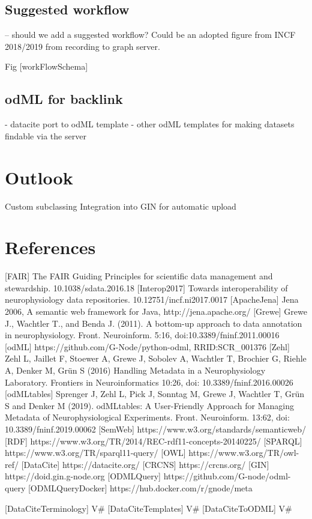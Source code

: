 \documentclass{article}
\begin{document}
\subsection{Suggested workflow}

-- should we add a suggested workflow? Could be an adopted figure from
   INCF 2018/2019 from recording to graph server.

Fig [workFlowSchema]

\subsection{odML for backlink}
- datacite port to odML template
- other odML templates for making datasets findable via the server

\section{Outlook}
Custom subclassing
Integration into GIN for automatic upload

\section{References}
[FAIR] The FAIR Guiding Principles for scientific data management and stewardship. 10.1038/sdata.2016.18
[Interop2017] Towards interoperability of neurophysiology data repositories. 10.12751/incf.ni2017.0017
[ApacheJena] Jena 2006, A semantic web framework for Java, http://jena.apache.org/
[Grewe] Grewe J., Wachtler T., and Benda J. (2011). A bottom-up approach to data annotation in neurophysiology. Front. Neuroinform. 5:16, doi:10.3389/fninf.2011.00016
[odML] https://github.com/G-Node/python-odml, RRID:SCR_001376
[Zehl] Zehl L, Jaillet F, Stoewer A, Grewe J, Sobolev A, Wachtler T, Brochier G, Riehle A, Denker M, Grün S (2016) Handling Metadata in a Neurophysiology Laboratory. Frontiers in Neuroinformatics 10:26, doi: 10.3389/fninf.2016.00026
[odMLtables] Sprenger J, Zehl L, Pick J, Sonntag M, Grewe J, Wachtler T, Grün S and Denker M (2019). odMLtables: A User-Friendly Approach for Managing Metadata of Neurophysiological Experiments. Front. Neuroinform. 13:62, doi: 10.3389/fninf.2019.00062
[SemWeb] https://www.w3.org/standards/semanticweb/
[RDF] https://www.w3.org/TR/2014/REC-rdf11-concepts-20140225/
[SPARQL] https://www.w3.org/TR/sparql11-query/
[OWL] https://www.w3.org/TR/owl-ref/
[DataCite] https://datacite.org/
[CRCNS] https://crcns.org/
[GIN] https://doid.gin.g-node.org
[ODMLQuery] https://github.com/G-node/odml-query
[ODMLQueryDocker] https://hub.docker.com/r/gnode/meta

[DataCiteTerminology] V#
[DataCiteTemplates] V#
[DataCiteToODML] V#
\end{document}
